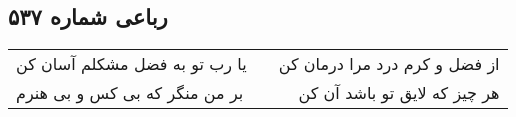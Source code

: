 \begin{center}
\section*{رباعی شماره ۵۳۷}
\label{sec:sh537}
\begin{longtable}{l p{0.5cm} r}
یا رب تو به فضل مشکلم آسان کن
&&
از فضل و کرم درد مرا درمان کن
\\
بر من منگر که بی کس و بی هنرم
&&
هر چیز که لایق تو باشد آن کن
\\
\end{longtable}
\end{center}
